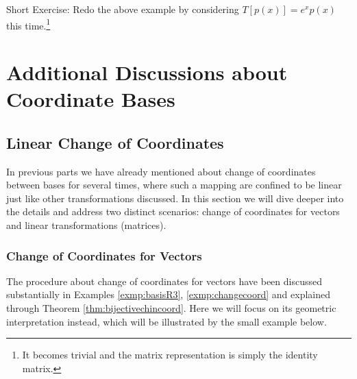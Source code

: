 Short Exercise: Redo the above example by considering $T[p(x)] = e^x p(x)$ this time.\footnote{It becomes trivial and the matrix representation is simply the identity matrix.}

\section{Additional Discussions about Coordinate Bases}

\subsection{Linear Change of Coordinates}
\label{section:coordchange}

In previous parts we have already mentioned about change of coordinates between bases for several times, where such a mapping are confined to be linear just like other transformations discussed. In this section we will dive deeper into the details and address two distinct scenarios: change of coordinates for vectors and linear transformations (matrices).

\subsubsection{Change of Coordinates for Vectors}
The procedure about change of coordinates for vectors have been discussed substantially in Examples \ref{exmp:basisR3}, \ref{exmp:changecoord} and explained through Theorem \ref{thm:bijectivechincoord}. Here we will focus on its geometric interpretation instead, which will be illustrated by the small example below.

